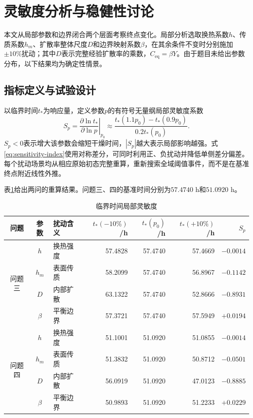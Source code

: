 \section{灵敏度分析与稳健性讨论}
\label{sec:sensitivity}

本文从局部参数和边界闭合两个层面考察终点变化。局部分析选取换热系数$h$、传质系数$h_m$、扩散率整体尺度$D$和边界映射系数$\beta$，在其余条件不变时分别施加$\pm10\%$扰动；其中$D$表示完整经验扩散率的乘数，$C_{\mathrm{eq}}=\beta Y$。由于题目未给出参数分布，以下结果均为确定性情景。

\subsection{指标定义与试验设计}

以临界时间$t_*$为响应量，定义参数$p$的有符号无量纲局部灵敏度系数
\begin{equation}
S_p=\left.\frac{\partial\ln t_*}{\partial\ln p}\right|_{p_0}
\approx\frac{t_*(1.1p_0)-t_*(0.9p_0)}{0.2t_*(p_0)}.
\label{eq:sensitivity-index}
\end{equation}
$S_p<0$表示增大该参数会缩短干燥时间，$|S_p|$越大表示局部影响越强。式\eqref{eq:sensitivity-index}使用对称差分，可同时利用正、负扰动并降低单侧差分偏差。每个扰动场景均从相应原始初态完整重算，重新搜索全域阈值事件，而不是在基准终点附近线性外推。

表\ref{tab:local-sensitivity}给出两问的重算结果。问题三、四的基准时间分别为$57.4740$ h和$51.0920$ h。

\begin{table}[htbp]
  \caption{临界时间局部灵敏度}
  \label{tab:local-sensitivity}
  \centering
  \begin{tabular}{cclrrrr}
    \toprule
    问题 & 参数 & 扰动含义 & $t_*(-10\%)$/h & $t_*(p_0)$/h & $t_*(+10\%)$/h & $S_p$ \\
    \midrule
    \multirow{4}{*}{问题三}
      & $h$ & 换热强度 & 57.4828 & 57.4740 & 57.4669 & $-0.0014$ \\
      & $h_m$ & 表面传质 & 58.2099 & 57.4740 & 56.8967 & $-0.1142$ \\
      & $D$ & 内部扩散 & 63.1322 & 57.4740 & 52.8666 & $-0.8931$ \\
      & $\beta$ & 平衡边界 & 57.3721 & 57.4740 & 57.5949 & $+0.0194$ \\
    \midrule
    \multirow{4}{*}{问题四}
      & $h$ & 换热强度 & 51.1001 & 51.0920 & 51.0855 & $-0.0014$ \\
      & $h_m$ & 表面传质 & 51.3832 & 51.0920 & 50.8712 & $-0.0501$ \\
      & $D$ & 内部扩散 & 56.0919 & 51.0920 & 47.0123 & $-0.8885$ \\
      & $\beta$ & 平衡边界 & 50.9893 & 51.0920 & 51.2233 & $+0.0229$ \\
    \bottomrule
  \end{tabular}
\end{table}

